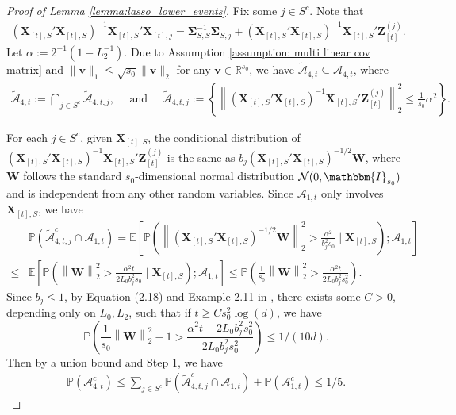 \documentclass[aos,preprint]{imsart}
\theoremstyle{plain}
\theoremstyle{definition}
\newcommand{\bX}{\boldsymbol{X}}
\newcommand{\bSigma}{\boldsymbol{\Sigma}}
\newcommand{\lmax}[1]{\lambda_{\max}\left(#1\right)}
\newcommand{\bv}{\boldsymbol{v}}
\newcommand{\bZ}{\boldsymbol{Z}}
\newcommand{\bW}{\boldsymbol{W}}
\newcommand{\bR}{\mathbb{R}}
\newcommand{\cA}{\mathcal{A}}
\newcommand{\Exp}{\mathbb{E}}
\newcommand{\Pro}{\mathbb{P}}
\begin{document}
\begin{appendix}
\begin{proof}[Proof of Lemma \ref{lemma:lasso_lower_events}]
Fix some $j \in S^c$. Note that
\begin{align*}
    \left(\bX_{[t],S}'\bX_{[t],S}\right)^{-1}
    \bX_{[t],S}' \bX_{[t],j} = \bSigma_{S,S}^{-1} \bSigma_{S,j} + \left(\bX_{[t],S}'\bX_{[t],S}\right)^{-1}
    \bX_{[t],S}' \bZ_{[t]}^{(j)}.
\end{align*}
Let $\alpha := 2^{-1}(1-L_2^{-1})$. Due to Assumption \ref{assumption: multi linear cov matrix} and $\|\bv\|_{1} \leq \sqrt{s_0} \|\bv\|_2$ for any $\bv \in \bR^{s_0}$, we have $\widetilde{\cA}_{4,t} \subseteq \cA_{4,t}$, where
\begin{align*}
    \widetilde{\cA}_{4,t} := \bigcap_{j \in S^{c}} \widetilde{\cA}_{4,t,j}, \quad \text{ and } \quad \widetilde{\cA}_{4,t,j}:=   \left\{\left\|\left(\bX_{[t],S}'\bX_{[t],S}\right)^{-1}
    \bX_{[t],S}' \bZ_{[t]}^{(j)}\right\|_2^2 \leq \frac{1}{s_0} \alpha^2
    \right\}.
\end{align*}

For each $j \in S^c$, given $\bX_{[t], S}$, the conditional distribution of $ (\bX_{[t],S}'\bX_{[t],S})^{-1} \bX_{[t],S}' \bZ_{[t]}^{(j)}$ is the same as $b_j (\bX_{[t],S}'\bX_{[t],S})^{-1/2} \bW$, where $\bW$ follows the standard $s_0$-dimensional normal distribution $\mathcal{N}(0,  \mathbbm{I}_{s_0})$ and is independent from any other random variables. Since $\cA_{1,t}$ only involves $\bX_{[t],S}$, we have
\begin{align*}
&\Pro\left(\widetilde{\cA}_{4,t,j}^c \cap \mathcal{A}_{1,t}\right)
=\Exp\left[\Pro\left(
\left\|(\bX_{[t],S}'\bX_{[t],S})^{-1/2} \bW\right\|_2^2 > \frac{\alpha^2}{b_j^2 s_0} \; \vert \;
    \bX_{[t],S}
\right) ; \mathcal{A}_{1,t}\right] \\
\leq &\Exp\left[\Pro\left(
\left\|\bW\right\|_2^2 > \frac{\alpha^2 t}{2 L_0 b_j^2 s_0} \; \vert \;
    \bX_{[t],S}
\right) ; \mathcal{A}_{1,t}\right]
\leq \Pro\left(
\frac{1}{s_0}\left\|\bW\right\|_2^2 > \frac{\alpha^2 t}{2 L_0 b_j^2 s_0^2}
\right).
\end{align*}  
Since $b_j \leq 1$, by Equation (2.18) and Example 2.11 in \cite{wainwright2019high}, there exists some $C > 0$, depending only on $L_0, L_2$, such that if $t \geq C s_0^2 \log(d)$, we have
$$\Pro\left(\frac{1}{s_0}\left\|\bW\right\|_2^2-1 > \frac{\alpha^2 t-2 L_0 b_j^2 s_0^2}{2 L_0 b_j^2 s_0^2}\right)\leq 1/(10d).$$ 
Then by a union bound and Step 1, we have
\begin{align*}
   \Pro\left({\cA}_{4,t}^c \right) \leq \sum_{j \in S^c} \Pro\left(\widetilde{\cA}_{4,t,j}^c \cap \mathcal{A}_{1,t}\right) + \Pro\left(  \mathcal{A}_{1,t}^c\right) \leq 1/5.
\end{align*}
\end{proof}


\end{appendix}
\end{document}
